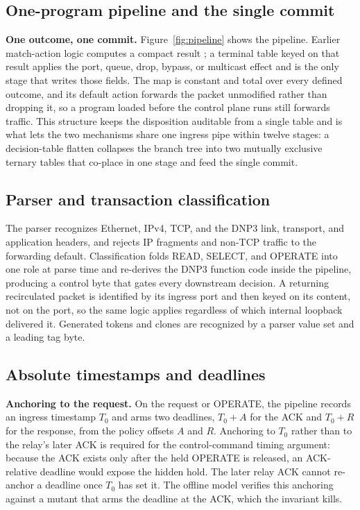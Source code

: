 \subsection{One-program pipeline and the single commit}
\textbf{One outcome, one commit.} Figure~\ref{fig:pipeline} shows the pipeline. Earlier match-action
logic computes a compact result
; a terminal table  keyed on that result applies the port, queue,
drop, bypass, or multicast effect and is the only stage that writes those fields. The map is
constant and total over every defined outcome, and its default action forwards the packet unmodified
rather than dropping it, so a program loaded before the control plane runs still forwards traffic.
This structure keeps the disposition auditable from a single table and is what lets the two mechanisms share
one ingress pipe within twelve stages: a decision-table flatten collapses the branch tree into two
mutually exclusive ternary tables that co-place in one stage and feed the single commit.

\subsection{Parser and transaction classification}
The parser recognizes Ethernet, IPv4, TCP, and the DNP3 link, transport, and application headers, and
rejects IP fragments and non-TCP traffic to the forwarding default. Classification folds READ, SELECT,
and OPERATE into one role at parse time and re-derives the DNP3 function code inside the pipeline,
producing a control byte that gates every downstream decision. A returning recirculated packet is
identified by its ingress port and then keyed on its content, not on the port, so the same logic
applies regardless of which internal loopback delivered it. Generated tokens and clones are
recognized by a parser value set and a leading tag byte.

\subsection{Absolute timestamps and deadlines}
\textbf{Anchoring to the request.} On the request or OPERATE, the pipeline records an ingress
timestamp $T_0$ and arms two deadlines, $T_0{+}A$ for the ACK and $T_0{+}R$ for the response, from the
policy offsets $A$ and $R$. Anchoring to $T_0$ rather than to the relay's later ACK is required for
the control-command timing argument: because the ACK exists only after the held OPERATE is released, an
ACK-relative deadline would expose the hidden hold. The later relay ACK cannot re-anchor a deadline
once $T_0$ has set it. The offline model verifies this anchoring against a mutant that arms the
deadline at the ACK, which the invariant kills.

